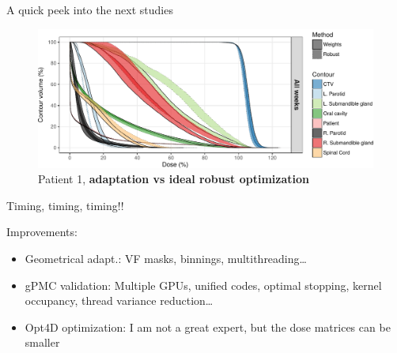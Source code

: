 \begin{frame}[c]{A quick peek into the next studies}
    \begin{figure}[h]
        \includegraphics[width=\textwidth]{imgs/robust_opt.pdf}
        \caption{Patient 1, \textbf{adaptation vs ideal robust optimization}}
    \end{figure}
\end{frame}


\begin{frame}[c]{Timing, timing, timing!!}
    \begin{table}[h]
        \caption{Current and expected times}
    \end{table}
    Improvements:
    \begin{itemize}
        \item Geometrical adapt.: VF masks, binnings, multithreading\ldots
        \item gPMC validation: Multiple GPUs, unified codes, optimal stopping, kernel occupancy, thread variance reduction\ldots
        \item Opt4D optimization: I am not a great expert, but the dose matrices can be smaller
    \end{itemize}

\end{frame}
